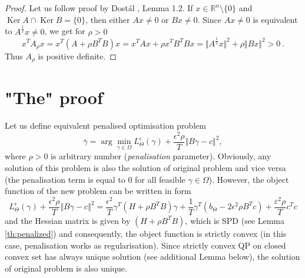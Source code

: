 \documentclass{article}
\DeclareMathOperator{\Ker}{Ker}
\begin{document}
\begin{proof}
Let us follow proof by Dost\'{a}l \cite{DosBOOK-2009}, Lemma 1.2. \newline
If $x \in \mathbb{R}^n \setminus \lbrace 0 \rbrace$ and $\Ker A \cap \Ker B = \lbrace 0 \rbrace$, then either $Ax \neq 0$ or $Bx \neq 0$.
Since $Ax \neq 0$ is equivalent to $A^{\frac{1}{2}}x \neq 0$,
we get for $\rho > 0$ 
\begin{displaymath}
 x^T A_{\rho} x = 
 x^T (A + \rho B^T B) x = x^T A x + \rho x^T B^T B x =
 \Vert A^{\frac{1}{2}}x \Vert^2 + \rho \Vert Bx \Vert^2 > 0~\mathrm{.} 
\end{displaymath}
Thus $A_{\rho}$ is positive definite. \newline
\end{proof}

\section{"The" proof}

Let us define equivalent penalised optimisation problem
\begin{displaymath}
 \bar{\gamma} =  \arg \min\limits_{\gamma \in \Omega} L_{\Theta}^{\epsilon}(\gamma) + \frac{\epsilon^2 \rho}{T} \Vert B \gamma - c \Vert^2 ,
\end{displaymath}
where $\rho > 0$ is arbitrary number (\emph{penalisation} parameter).
Obviously, any solution of this problem is also the solution of original problem and vice versa (the penalisation term is equal to $0$ for all feasible $\gamma \in \Omega$).
However, the object function of the new problem can be written in form
\begin{displaymath}
  L_{\Theta}^{\epsilon}(\gamma) + \frac{\epsilon^2 \rho}{T} \Vert B \gamma - c \Vert^2 = \frac{\epsilon^2}{T} \gamma^T (H + \rho B^T B) \gamma + \frac{1}{T} \gamma^T (b_{\Theta} - 2 \epsilon^2 \rho B^T c) + \frac{\varepsilon^2 \rho}{T} c^T c
\end{displaymath} 
and the Hessian matrix is given by $(H + \rho B^T B)$, which is SPD (see Lemma \ref{th:penalized}) and consequently, the object function is strictly convex (in this case, penalisation works as regularisation).
Since strictly convex QP on closed convex set has always unique solution (see additional Lemma below), the solution of original problem is also unique.
\end{document}
